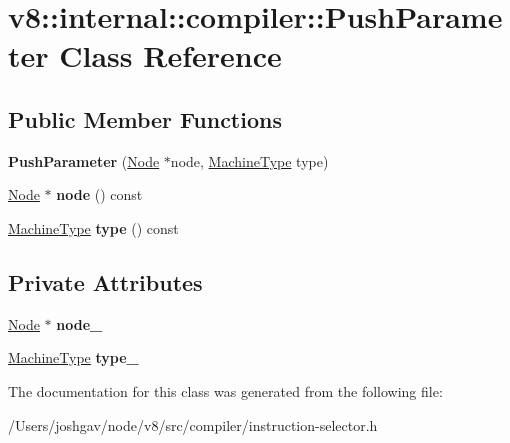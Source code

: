 \hypertarget{classv8_1_1internal_1_1compiler_1_1_push_parameter}{}\section{v8\+:\+:internal\+:\+:compiler\+:\+:Push\+Parameter Class Reference}
\label{classv8_1_1internal_1_1compiler_1_1_push_parameter}
\subsection*{Public Member Functions}
\begin{DoxyCompactItemize}
\item 
{\bfseries Push\+Parameter} (\hyperlink{classv8_1_1internal_1_1compiler_1_1_node}{Node} $\ast$node, \hyperlink{classv8_1_1internal_1_1_machine_type}{Machine\+Type} type)\hypertarget{classv8_1_1internal_1_1compiler_1_1_push_parameter_a297d24f5a9159dc011cbfc7fef90f7ec}{}\label{classv8_1_1internal_1_1compiler_1_1_push_parameter_a297d24f5a9159dc011cbfc7fef90f7ec}

\item 
\hyperlink{classv8_1_1internal_1_1compiler_1_1_node}{Node} $\ast$ {\bfseries node} () const \hypertarget{classv8_1_1internal_1_1compiler_1_1_push_parameter_abdf840fd592c55853f63ffeb8f363c02}{}\label{classv8_1_1internal_1_1compiler_1_1_push_parameter_abdf840fd592c55853f63ffeb8f363c02}

\item 
\hyperlink{classv8_1_1internal_1_1_machine_type}{Machine\+Type} {\bfseries type} () const \hypertarget{classv8_1_1internal_1_1compiler_1_1_push_parameter_a6d6a814009398c12410c36dc7a0bf2eb}{}\label{classv8_1_1internal_1_1compiler_1_1_push_parameter_a6d6a814009398c12410c36dc7a0bf2eb}

\end{DoxyCompactItemize}
\subsection*{Private Attributes}
\begin{DoxyCompactItemize}
\item 
\hyperlink{classv8_1_1internal_1_1compiler_1_1_node}{Node} $\ast$ {\bfseries node\+\_\+}\hypertarget{classv8_1_1internal_1_1compiler_1_1_push_parameter_adee6e7c5f60f6c1202d7b4e57fc1bfd4}{}\label{classv8_1_1internal_1_1compiler_1_1_push_parameter_adee6e7c5f60f6c1202d7b4e57fc1bfd4}

\item 
\hyperlink{classv8_1_1internal_1_1_machine_type}{Machine\+Type} {\bfseries type\+\_\+}\hypertarget{classv8_1_1internal_1_1compiler_1_1_push_parameter_a8bbb00bfbf096a819937b2dd6c6a6d44}{}\label{classv8_1_1internal_1_1compiler_1_1_push_parameter_a8bbb00bfbf096a819937b2dd6c6a6d44}

\end{DoxyCompactItemize}


The documentation for this class was generated from the following file\+:\begin{DoxyCompactItemize}
\item 
/\+Users/joshgav/node/v8/src/compiler/instruction-\/selector.\+h\end{DoxyCompactItemize}
